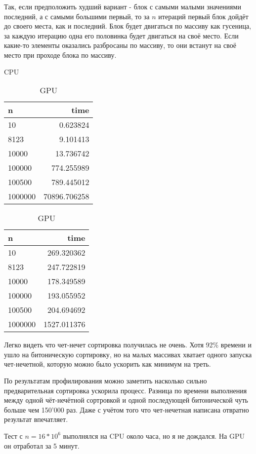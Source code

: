 \documentclass[12pt]{article}
\begin{document}
Так, если предположить худший вариант - блок с самыми малыми значениями последний, а с самыми большими первый,
то за $n$ итераций первый блок дойдёт до своего места, как и последний.
Блок будет двигаться по массиву как гусеница, за каждую итерацию одна его половинка будет двигаться на своё место.
Если какие-то элементы оказались разбросаны по массиву, то они встанут на своё место при проходе блока по массиву.

{
}

\newpage


\begin{table}[!htb]
\begin{minipage}{.49\linewidth}
\centering
\caption*{CPU}
\begin{tabular}{|l|r|}
	\hline
	n       & time         \\
	\hline

	10      & 0.623824     \\
	8123    & 9.101413     \\
	10000   & 13.736742    \\
	100000  & 774.255989   \\
	100500  & 789.445012   \\
	1000000 & 70896.706258 \\
	\hline
\end{tabular}
\end {minipage} %
\begin{minipage}{.49\linewidth}
\centering
\caption*{GPU}
\begin{tabular}{|l|r|}
	\hline
	n       & time        \\
	\hline

	10      & 269.320362  \\
	8123    & 247.722819  \\
	10000   & 178.349589  \\
	100000  & 193.055952  \\
	100500  & 204.694692  \\
	1000000 & 1527.011376 \\
	\hline
\end{tabular}
\end {minipage}
\end{table}



Легко видеть что чет-нечет сортировка получилась не очень.
Хотя 92\% времени и ушло на битоническую сортировку,
но на малых массивах хватает одного запуска чет-нечетной, которую можно было ускорить как минимум на треть.


По результатам профилирования можно заметить насколько сильно предварительная сортировка ускорила процесс.
Разница по времени выполнения между одной чёт-нечётной сортровкой и одной последующей битонической чуть больше чем
150'000 раз. Даже с учётом того что чет-нечетная написана отвратно результат впечатляет.

Тест с $n=16*10^6$ выполнялся на CPU около часа, но я не дождался. На GPU он отработал за 5 минут.
\end{document}
